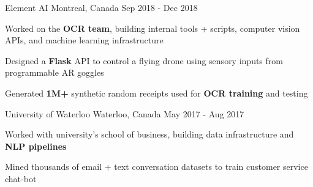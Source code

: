 \documentclass[11pt, a4paper]{awesome-cv}
\begin{document}
\begin{siderules1}
\begin{cventries}
{    }
    \cventry
    {\textit{}}
    {Element AI}
    {Montreal, Canada}
    {Sep 2018 - Dec 2018}
    {
      \begin{cvitems}
        \item {Worked on the \textbf{OCR team}, building internal tools + scripts, computer vision APIs, and machine learning infrastructure}
        \item {Designed a \textbf{Flask} API to control a flying drone using sensory inputs from programmable AR goggles}
        \item {Generated \textbf{1M+} synthetic random receipts used for \textbf{OCR training} and testing}
      \end{cvitems}
    }
  \cventry
    {\textit{}}
    {University of Waterloo}
    {Waterloo, Canada}
    {May 2017 - Aug 2017}
    {
      \begin{cvitems}
        \item {Worked with university's school of business, building data infrastructure and \textbf{NLP pipelines}}
        \item {Mined thousands of email + text conversation datasets to train customer service chat-bot}
      \end{cvitems}
    }
\end{cventries}
\end{siderules1}
\end{document}
